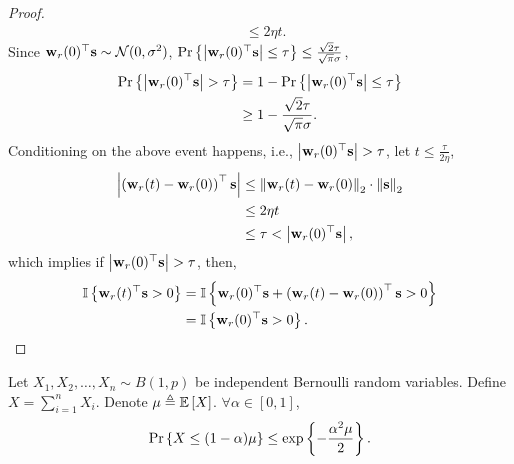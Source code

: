 \begin{proof}
\begin{equation*}
\begin{split}
	&\le 2 \eta t .
\end{split}
\end{equation*}
Since ${\mathbf{w}}_r(0)^\top {\mathbf{s}} \sim {\mathcal{N}}(0, \sigma^2)$, ${\text{Pr}}\left\{ \left| {\mathbf{w}}_r(0)^\top {\mathbf{s}} \right| \le \tau\right\} \le  \frac{\sqrt{2}\tau}{\sqrt{\pi}\sigma}$,
\begin{equation*}
\begin{split}
	{\text{Pr}}\left\{ \left| {\mathbf{w}}_r(0)^\top {\mathbf{s}} \right| > \tau\right\} &= 1 - {\text{Pr}}\left\{ \left| {\mathbf{w}}_r(0)^\top {\mathbf{s}} \right| \le \tau\right\} \\
	&\ge 1 - \frac{\sqrt{2}\tau}{\sqrt{\pi}\sigma}.
\end{split}
\end{equation*}
Conditioning on the above event happens, i.e., $ \left| {\mathbf{w}}_r(0)^\top {\mathbf{s}} \right| > \tau$, let $t \le \frac{\tau}{ 2 \eta }$,
\begin{equation*}
\begin{split}
	\left| \left( {\mathbf{w}}_r(t) - {\mathbf{w}}_r(0) \right)^\top {\mathbf{s}} \right| &\le \left\| {\mathbf{w}}_r(t) - {\mathbf{w}}_r(0) \right\|_2 \cdot \left\| {\mathbf{s}} \right\|_2 \\
	&\le 2 \eta t \\
	&\le \tau < \left| {\mathbf{w}}_r(0)^\top {\mathbf{s}} \right|,
\end{split}
\end{equation*}
which implies if $\left| {\mathbf{w}}_r(0)^\top {\mathbf{s}} \right| > \tau$, then,
\begin{equation*}
\begin{split}
	{\mathbb{I}}\left\{ {\mathbf{w}}_r(t)^\top {\mathbf{s}} > 0 \right\} &= {\mathbb{I}}\left\{ {\mathbf{w}}_r(0)^\top {\mathbf{s}}  + \left( {\mathbf{w}}_r(t) - {\mathbf{w}}_r(0) \right)^\top {\mathbf{s}} > 0 \right\} \\
	&= {\mathbb{I}}\left\{ {\mathbf{w}}_r(0)^\top {\mathbf{s}} > 0 \right\}. \qedhere
\end{split}
\end{equation*}
\end{proof}

\begin{lem}[Chernoff]
\label{lem:chernoff}
    Let $X_1, X_2, \dots, X_n \sim B(1, p)$ be independent Bernoulli random variables. Define $X = \sum\limits_{i=1}^{n}{ X_i  }$. Denote $\mu \triangleq {\mathbb{E}}\left[ X \right]$. $\forall \alpha \in [0,1]$,
\begin{equation*}
    {\text{Pr}}\left\{ X \le (1 - \alpha) \mu \right\} \le \exp\left\{ - \frac{\alpha^2 \mu}{2} \right\}.
\end{equation*}
\end{lem}

